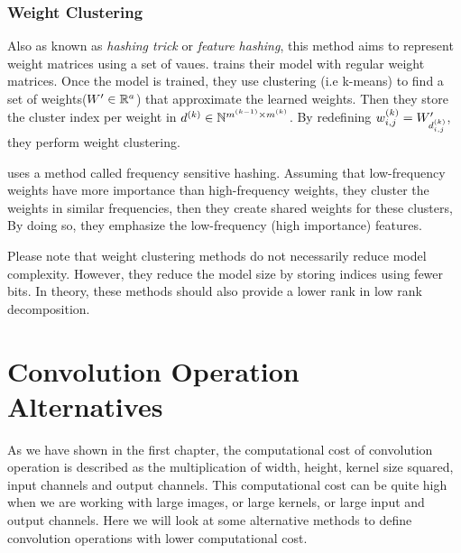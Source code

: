 \subsubsection{Weight Clustering}
Also as known as \textit{hashing trick} or \textit{feature hashing}, this method aims to represent weight matrices using a set of vaues. \cite{nowlan1992simplifying} trains their model with regular weight matrices. Once the model is trained, they use clustering (i.e k-means) to find a set of weights($\all\weights' \inreal{a}$) that approximate the learned weights. Then they store the cluster index per weight in $d^{(k)} \in \mathbb{N}^{m^{(k-1)} \times m^{(k)}}$. By redefining $\wk{k}_{i,j} = \all\weights'_{d^{(k)}_{i,j}}$, they perform weight clustering. 

\cite{chen2015compressing} uses a method called frequency sensitive hashing. Assuming that low-frequency weights have more importance than high-frequency weights, they cluster the weights in similar frequencies, then they create shared weights for these clusters, By doing so, they emphasize the low-frequency (high importance) features.

Please note that weight clustering methods do not necessarily reduce model complexity. However, they reduce the model size by storing indices using fewer bits. In theory, these methods should also provide a lower rank in low rank decomposition.

\section{Convolution Operation Alternatives}
\label{sec:conv_alternatives}
As we have shown in the first chapter, the computational cost of convolution operation is described as the multiplication of width, height, kernel size squared, input channels and output channels. This computational cost can be quite high when we are working with large images, or large kernels, or large input and output channels. Here we will look at some alternative methods to define convolution operations with lower computational cost.
